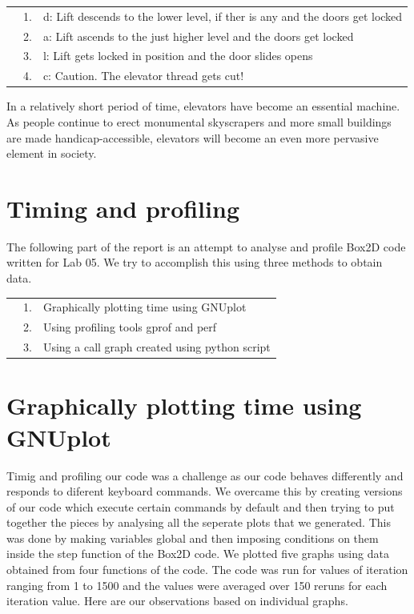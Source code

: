\documentclass[a4paper,11pt]{article}
\begin{document}
\begin{tabular}{l l l}
& 1. & d: Lift descends to the lower level, if ther is any and the doors get locked \\
& 2. & a: Lift ascends to the just higher level and the doors get locked\\
& 3. & l: Lift gets locked in position and the door slides opens\\
& 4. & c: Caution. The elevator thread gets cut!\\
\end{tabular}

In a relatively short period of time, elevators have become an essential machine. As people continue to erect monumental skyscrapers and more small buildings are made handicap-accessible, elevators will become an even more pervasive element in society. 

\section{Timing and profiling}
The following part of the report is an attempt to analyse and profile Box2D code written for Lab 05. We try to accomplish this using three methods to obtain data.

\begin{tabular}{l l l}
& 1. & Graphically plotting time using GNUplot\\
& 2. & Using profiling tools gprof and perf\\
& 3. & Using a call graph created using python script\\
\end{tabular}

\section{Graphically plotting time using GNUplot}
Timig and profiling our code was a challenge as our code behaves differently and responds to diferent keyboard commands. We overcame this by creating versions of our code which execute certain commands by default and then trying to put together the pieces by analysing all the seperate plots that we generated. This was done by making variables global and then imposing conditions on them inside the step function of the Box2D code. 
We plotted five graphs using data obtained from four functions of the code. The code was run for values of iteration ranging from 1 to 1500 and the values were averaged over 150 reruns for each iteration value. Here are our observations based on individual graphs. 
\end{document}
